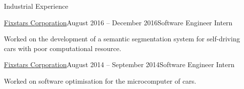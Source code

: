 \documentclass{resume} %
\begin{document}
\begin{rSection}{Industrial Experience}
    \begin{rSubsection}{\href{https://www.fixstars.com/en/}{Fixstars Corporation}}{August 2016 -- December 2016}{Software Engineer Intern}{}
    \item Worked on the development of a semantic segmentation system for self-driving cars with poor computational resource.
    \end{rSubsection}

    \begin{rSubsection}{\href{https://www.fixstars.com/en/}{Fixstars Corporation}}{August 2014 -- September 2014}{Software Engineer Intern}{}
    \item Worked on software optimisation for the microcomputer of cars.
    \end{rSubsection}

\end{rSection}

\end{document}
